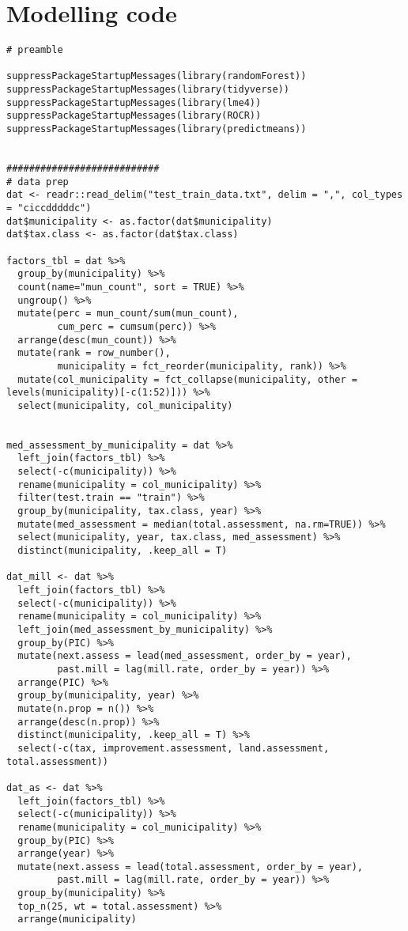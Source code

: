\documentclass{article}
\begin{document}
\section{Modelling code}


\begin{lstlisting}[style=R, caption={Code used for the modeling.}, captionpos=b]
# preamble

suppressPackageStartupMessages(library(randomForest))
suppressPackageStartupMessages(library(tidyverse))
suppressPackageStartupMessages(library(lme4))
suppressPackageStartupMessages(library(ROCR))
suppressPackageStartupMessages(library(predictmeans))


###########################
# data prep
dat <- readr::read_delim("test_train_data.txt", delim = ",", col_types = "ciccdddddc")
dat$municipality <- as.factor(dat$municipality)
dat$tax.class <- as.factor(dat$tax.class)

factors_tbl = dat %>% 
  group_by(municipality) %>% 
  count(name="mun_count", sort = TRUE) %>% 
  ungroup() %>% 
  mutate(perc = mun_count/sum(mun_count),
         cum_perc = cumsum(perc)) %>% 
  arrange(desc(mun_count)) %>% 
  mutate(rank = row_number(),
         municipality = fct_reorder(municipality, rank)) %>% 
  mutate(col_municipality = fct_collapse(municipality, other = levels(municipality)[-c(1:52)])) %>% 
  select(municipality, col_municipality)


med_assessment_by_municipality = dat %>% 
  left_join(factors_tbl) %>% 
  select(-c(municipality)) %>% 
  rename(municipality = col_municipality) %>% 
  filter(test.train == "train") %>% 
  group_by(municipality, tax.class, year) %>% 
  mutate(med_assessment = median(total.assessment, na.rm=TRUE)) %>% 
  select(municipality, year, tax.class, med_assessment) %>% 
  distinct(municipality, .keep_all = T)

dat_mill <- dat %>% 
  left_join(factors_tbl) %>% 
  select(-c(municipality)) %>% 
  rename(municipality = col_municipality) %>% 
  left_join(med_assessment_by_municipality) %>% 
  group_by(PIC) %>% 
  mutate(next.assess = lead(med_assessment, order_by = year),
         past.mill = lag(mill.rate, order_by = year)) %>%
  arrange(PIC) %>% 
  group_by(municipality, year) %>% 
  mutate(n.prop = n()) %>% 
  arrange(desc(n.prop)) %>% 
  distinct(municipality, .keep_all = T) %>% 
  select(-c(tax, improvement.assessment, land.assessment, total.assessment))

dat_as <- dat %>% 
  left_join(factors_tbl) %>% 
  select(-c(municipality)) %>% 
  rename(municipality = col_municipality) %>% 
  group_by(PIC) %>% 
  arrange(year) %>% 
  mutate(next.assess = lead(total.assessment, order_by = year),
         past.mill = lag(mill.rate, order_by = year)) %>% 
  group_by(municipality) %>% 
  top_n(25, wt = total.assessment) %>% 
  arrange(municipality)


\end{lstlisting}
\end{document}
